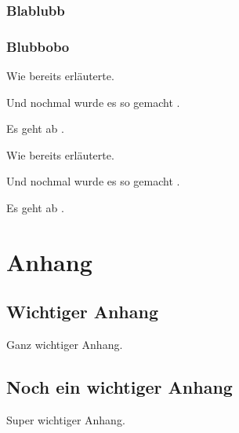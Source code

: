\documentclass{bht-thesis}
\newcounter{savepage}
\begin{document}
\subsection{Blablubb}
\blindtext[4]
\blindtext[2]
\blindtext[3]
\subsection{Blubbobo}
Wie \citet[S.~6]{ahu61} bereits erläuterte.

Und nochmal wurde es so gemacht \citep[S.~15]{ahu61}.

Es geht ab \cite[S.~121]{ahu61}.

Wie \citet[S.~6]{ahu61} bereits erläuterte.

Und nochmal wurde es so gemacht \citep[S.~15]{ahu61}.

Es geht ab \cite[S.~121]{ahu61}.

\cleardoublepage
\setcounter{page}{\thesavepage}



\cleardoublepage
\appendix
\chapter{Anhang}
\section{Wichtiger Anhang}
Ganz wichtiger Anhang.
\section{Noch ein wichtiger Anhang}
Super wichtiger Anhang.

\cleardoublepage
{}
\statutorydeclaration
\end{document}
